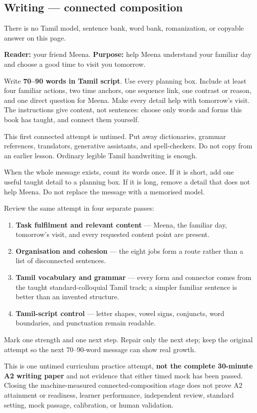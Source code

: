 \subsection*{Writing — connected composition}
There is no Tamil model, sentence bank, word bank, romanization, or copyable answer on this page.

\textbf{Reader:} your friend Meena. \textbf{Purpose:} help Meena understand your familiar day and choose a good time to visit you tomorrow.

Write \textbf{70–90 words in Tamil script}. Use every planning box. Include at least four familiar actions, two time anchors, one sequence link, one contrast or reason, and one direct question for Meena. Make every detail help with tomorrow's visit. The instructions give content, not sentences: choose only words and forms this book has taught, and connect them yourself.

This first connected attempt is untimed. Put away dictionaries, grammar references, translators, generative assistants, and spell-checkers. Do not copy from an earlier lesson. Ordinary legible Tamil handwriting is enough.

When the whole message exists, count its words once. If it is short, add one useful taught detail to a planning box. If it is long, remove a detail that does not help Meena. Do not replace the message with a memorised model.

\begin{tcolorbox}[breakable,colback=teal!4,colframe=teal!35!black,title={Before you move on}]
Review the same attempt in four separate passes:

\begin{enumerate}
\raggedright
  \item \textbf{Task fulfilment and relevant content} — Meena, the familiar day, tomorrow's visit, and every requested content point are present.
  \item \textbf{Organisation and cohesion} — the eight jobs form a route rather than a list of disconnected sentences.
  \item \textbf{Tamil vocabulary and grammar} — every form and connector comes from the taught standard-colloquial Tamil track; a simpler familiar sentence is better than an invented structure.
  \item \textbf{Tamil-script control} — letter shapes, vowel signs, conjuncts, word boundaries, and punctuation remain readable.
\end{enumerate}

Mark one strength and one next step. Repair only the next step; keep the original attempt so the next 70–90-word message can show real growth.

This is one untimed curriculum practice attempt, \textbf{not the complete 30-minute A2 writing paper} and not evidence that either timed mock has been passed. Closing the machine-measured connected-composition stage does not prove A2 attainment or readiness, learner performance, independent review, standard setting, mock passage, calibration, or human validation.
\end{tcolorbox}
